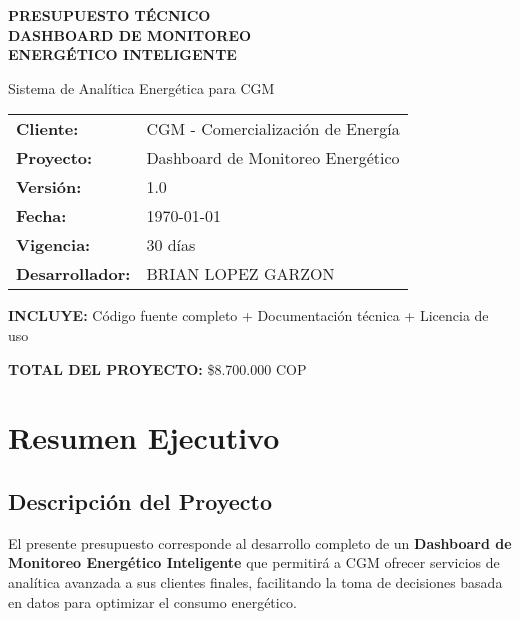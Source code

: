 \documentclass[12pt,a4paper]{article}
\begin{document}
\begin{titlepage}
\centering
\vspace*{2cm}

{\Huge\bfseries\color{headerblue} PRESUPUESTO TÉCNICO\\[0.5cm] DASHBOARD DE MONITOREO\\[0.3cm] ENERGÉTICO INTELIGENTE}

\vspace{1cm}

{\Large Sistema de Analítica Energética para CGM}

\vspace{2cm}

\begin{tabular}{ll}
\textbf{Cliente:} & CGM - Comercialización de Energía \\
\textbf{Proyecto:} & Dashboard de Monitoreo Energético \\
\textbf{Versión:} & 1.0 \\
\textbf{Fecha:} & \today \\
\textbf{Vigencia:} & 30 días \\
\textbf{Desarrollador:} & BRIAN LOPEZ GARZON \\
\end{tabular}

\vspace{3cm}

{\large \textbf{INCLUYE:} Código fuente completo + Documentación técnica + Licencia de uso}

\vfill

{\large \textbf{TOTAL DEL PROYECTO:} \color{headerblue}\Huge\$8.700.000 COP}

\end{titlepage}

\tableofcontents
\newpage

\section{Resumen Ejecutivo}

\subsection{Descripción del Proyecto}

El presente presupuesto corresponde al desarrollo completo de un \textbf{Dashboard de Monitoreo Energético Inteligente} que permitirá a CGM ofrecer servicios de analítica avanzada a sus clientes finales, facilitando la toma de decisiones basada en datos para optimizar el consumo energético.
\end{document}

